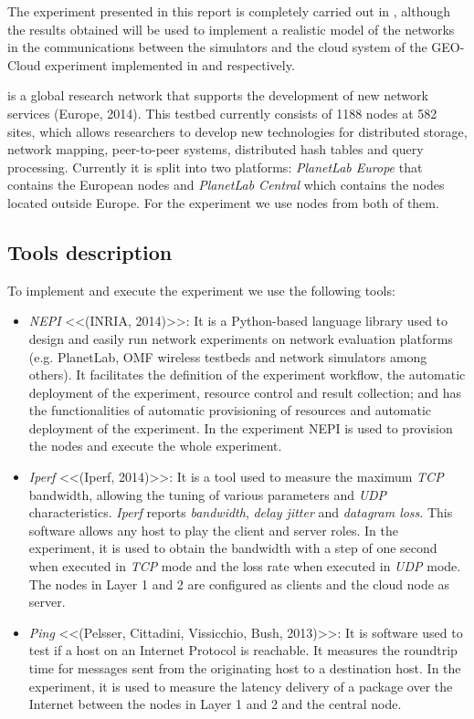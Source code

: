 The experiment presented in this report is completely carried out in \pl, although the results obtained will be used to implement a realistic model of the networks in the communications between the simulators and the cloud system of the GEO-Cloud experiment implemented in \vw and \bonfire respectively. 

\pl is a global research network that supports the development of new network
services (Europe, 2014). This testbed currently consists of 1188 nodes at 582
sites, which allows researchers to develop new technologies for distributed
storage, network mapping, peer-to-peer systems, distributed hash tables and
query processing. Currently it is split into two platforms: \emph{PlanetLab
  Europe} that contains the European nodes and \emph{PlanetLab Central} which
contains the nodes located outside Europe. 
For the experiment we use nodes from both of them. 

\subsection{Tools description}

To implement and execute the experiment we use the following tools: 
\begin{itemize}
\item \emph{NEPI} <<(INRIA, 2014)>>: It is a Python-based language library used to design and easily run network experiments on network evaluation platforms (e.g. PlanetLab, OMF wireless testbeds and network simulators among others). It facilitates the definition of the experiment workflow, the automatic deployment of the experiment, resource control and result collection; and has the functionalities of automatic provisioning of resources and automatic deployment of the experiment. In the experiment NEPI is used to provision the nodes and execute the whole experiment. 
\item \emph{Iperf} <<(Iperf, 2014)>>: It is a tool used to measure the maximum \emph{TCP} bandwidth, allowing the tuning of various parameters and \emph{UDP} characteristics. \emph{Iperf} reports \emph{bandwidth}, \emph{delay jitter} and \emph{datagram loss}. This software allows any host to play the client and server roles. In the experiment, it is used to obtain the bandwidth with a step of one second when executed in \emph{TCP} mode and the loss rate when executed in \emph{UDP} mode. The nodes in Layer 1 and 2 are configured as clients and the cloud node as server. 
\item \emph{Ping} <<(Pelsser, Cittadini, Vissicchio, Bush, 2013)>>: It is software used to test if a host on an Internet Protocol is reachable. It measures the roundtrip time for messages sent from the originating host to a destination host. In the experiment, it is used to measure the latency delivery of a package over the Internet between the nodes in Layer 1 and 2 and the central node.
\end{itemize}

